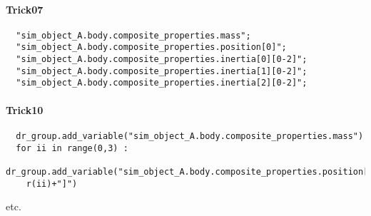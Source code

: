 \paragraph{Trick07}
\begin{verbatim}
  "sim_object_A.body.composite_properties.mass";
  "sim_object_A.body.composite_properties.position[0]";
  "sim_object_A.body.composite_properties.inertia[0][0-2]";
  "sim_object_A.body.composite_properties.inertia[1][0-2]";
  "sim_object_A.body.composite_properties.inertia[2][0-2]";
\end{verbatim}

\paragraph{Trick10}
\begin{verbatim}
  dr_group.add_variable("sim_object_A.body.composite_properties.mass")
  for ii in range(0,3) :
    dr_group.add_variable("sim_object_A.body.composite_properties.position["+st
    r(ii)+"]")
\end{verbatim}
etc.
